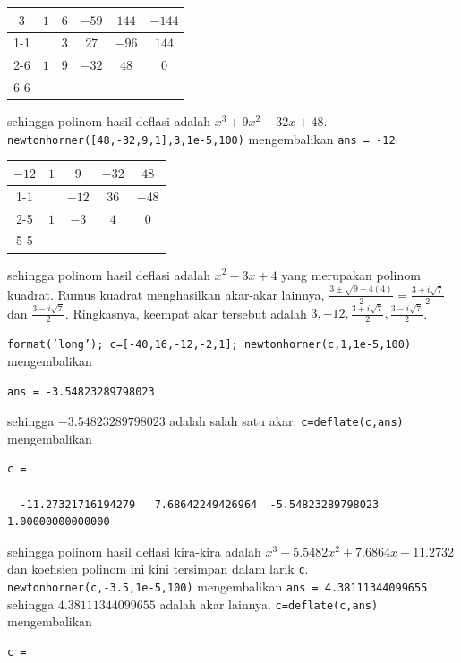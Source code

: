 \begin{description}
\begin{center}
\begin{tabular}{cccccc}
\multicolumn{1}{c|}{$3$} & $1$ & $6$ & $-59$ & $144$ & $-144$\tabularnewline
\cline{1-1}
 &  & $3$ & $27$ & $-96$ & $144$\tabularnewline
\cline{2-6}
 & $1$ & $9$ & $-32$ & \multicolumn{1}{c|}{$48$} & \multicolumn{1}{c|}{$0$}\tabularnewline
\cline{6-6}
\end{tabular}
\par\end{center}

sehingga polinom hasil deflasi adalah $x^{3}+9x^{2}-32x+48$. \texttt{newtonhorner({[}48,-32,9,1{]},3,1e-5,100)}
mengembalikan \texttt{ans = -12}.

\begin{center}
\begin{tabular}{ccccc}
\multicolumn{1}{c|}{$-12$} & $1$ & $9$ & $-32$ & $48$\tabularnewline
\cline{1-1}
 &  & $-12$ & $36$ & $-48$\tabularnewline
\cline{2-5}
 & $1$ & $-3$ & \multicolumn{1}{c|}{$4$} & \multicolumn{1}{c|}{$0$}\tabularnewline
\cline{5-5}
\end{tabular}
\par\end{center}

sehingga polinom hasil deflasi adalah $x^{2}-3x+4$ yang merupakan
polinom kuadrat. Rumus kuadrat menghasilkan akar-akar lainnya, $\frac{3\pm\sqrt{9-4(4)}}{2}=\frac{3+i\sqrt{7}}{2}$
dan $\frac{3-i\sqrt{7}}{2}$. Ringkasnya, keempat akar tersebut adalah
$3,-12,\frac{3+i\sqrt{7}}{2},\frac{3-i\sqrt{7}}{2}$.
\item [{\ref{exc:polynomials-16}:}] \texttt{format('long'); c={[}-40,16,-12,-2,1{]};
newtonhorner(c,1,1e-5,100)} mengembalikan 

\begin{center}
\texttt{ans = -3.54823289798023}
\par\end{center}

sehingga $-3.54823289798023$ adalah salah satu akar. \texttt{c=deflate(c,ans)}
mengembalikan \begin{verbatim}
c =

  -11.27321716194279   7.68642249426964  -5.54823289798023   1.00000000000000
\end{verbatim} sehingga polinom hasil deflasi kira-kira adalah $x^{3}-5.5482x^{2}+7.6864x-11.2732$
dan koefisien polinom ini kini tersimpan dalam larik \texttt{c}. \texttt{newtonhorner(c,-3.5,1e-5,100)}
mengembalikan \texttt{ans = 4.38111344099655} sehingga $4.38111344099655$
adalah akar lainnya. \texttt{c=deflate(c,ans)} mengembalikan \begin{verbatim}
c =


\end{verbatim}
\end{description}
